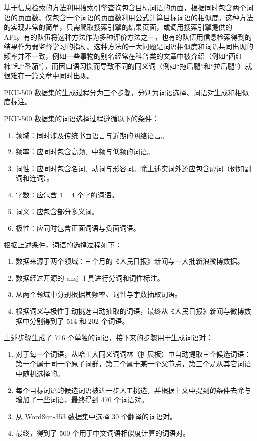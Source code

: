 基于信息检索的方法利用搜索引擎查询包含目标词语的页面，根据同时包含两个词语的页面数、仅包含一个词语的页面数利用公式计算目标词语的相似度。这种方法的实现非常的简单，只需爬取搜索引擎的结果页面，或调用搜索引擎提供的 API。有的队伍将这种方法作为多种评价方法之一，也有的队伍用信息检索得到的结果作为弱监督学习的指标。这种方法的一大问题是词语相似度和词语共同出现的频率并不一致，例如一些事物的别名经常在科普类的文章中被介绍（例如“西红柿”和“番茄”），而因口语习惯而导致不同的同义词（例如“拖后腿”和“拉后腿”）就很难在一篇文章中同时出现。

PKU-500 数据集的生成过程分为三个步骤，分别为词语选择、词语对生成和相似度标注。

PKU-500 数据集的词语选择过程遵循以下的条件：
\begin{enumerate}
	\item 领域：同时涉及传统书面语言与近期的网络语言。
	\item 频率：应同时包含高频、中频与低频的词语。
	\item 词性：应同时包含名词、动词与形容词。除上述实词外还应包含虚词（例如副词和连词）。
	\item 字数：应包含 1 -- 4 个字的词语。
	\item 词义：应包含部分多义词。
	\item 极性：应同时包含正面词语与负面词语。
\end{enumerate}
根据上述条件，词语的选择过程如下：
\begin{enumerate}
	\item 数据来源于两个领域：三个月的《人民日报》新闻与一大批新浪微博数据。
	\item 数据经过开源的 ansj 工具进行分词和词性标注。
	\item 从两个领域中分别根据其频率、词性与字数抽取词语。
	\item 根据词义与极性手动挑选自动抽取的词语，最终从《人民日报》新闻与微博数据中分别得到了 514 和 202 个词语。
\end{enumerate}

上述步骤生成了 716 个单独的词语，接下来的步骤用于生成词语对：
\begin{enumerate}
	\item 对于每一个词语，从哈工大同义词词林（扩展板）中自动提取三个候选词语：第一个属于同一个原子词群，第二个属于某一个父节点，第三个是从其它词语中随机选择的。
	\item 每个目标词语的候选词语被进一步人工挑选，并根据上文中提到的条件去除与增加了一些词语，最终得到 470 个词语对。
	\item 从 WordSim-353 数据集中选择 30 个翻译的词语对。
	\item 最终，得到了 500 个用于中文词语相似度计算的词语对。
\end{enumerate}

